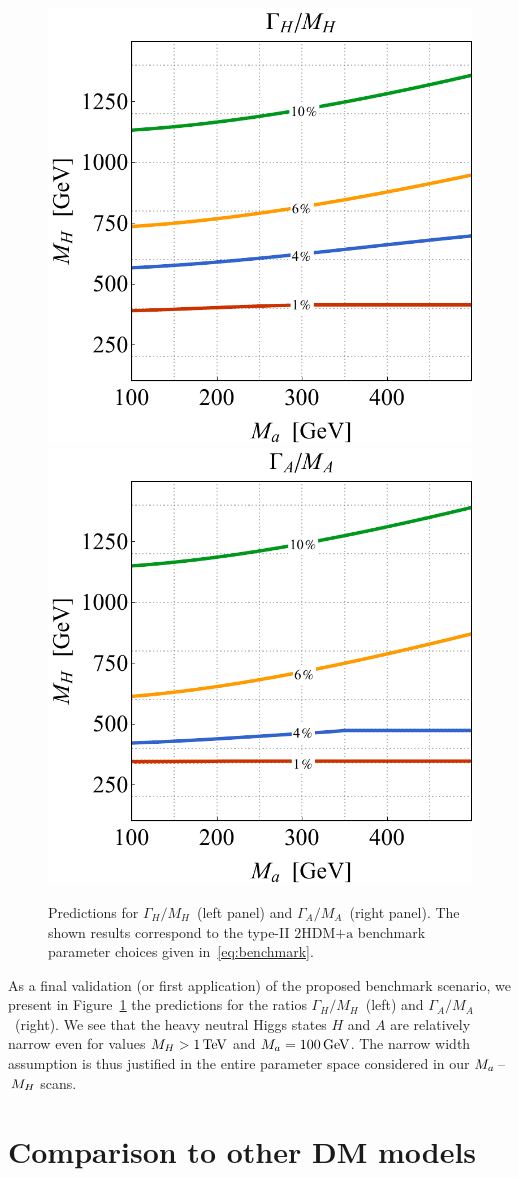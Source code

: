 \documentclass[a4paper, 11pt,notoc]{article}
\newcommand{\hdma}{\ensuremath{\textrm{2HDM+a}}\xspace}
\begin{document}
\begin{figure}[t!]
\centering
\includegraphics[height=.45\textwidth]{figure5l.pdf} \qquad 
\includegraphics[height=.45\textwidth]{figure5r.pdf}
\vspace{4mm}
\caption{\label{fig:Gammas}  Predictions for  $\Gamma_H/M_H$~(left panel) and $\Gamma_A/M_A$~(right panel). The shown results correspond to the type-II \hdma benchmark parameter choices given in~\eqref{eq:benchmark}.}
\end{figure}

As a final validation (or first application) of the proposed benchmark scenario, we present in  Figure~\ref{fig:Gammas} the predictions for the ratios $\Gamma_H/M_H$~(left) and $\Gamma_A/M_A$~(right). We see that the heavy neutral Higgs states $H$ and $A$ are relatively narrow even for values $M_H > 1 \, {\rm TeV}$ and $M_a = 100 \, {\rm GeV}$.  The narrow width assumption is thus justified in the entire parameter space considered in our $M_a\hspace{0.5mm}$--$\hspace{0.5mm}M_H$ scans. 


\section{Comparison to other DM models}
\label{sec:comparison}
\end{document}

